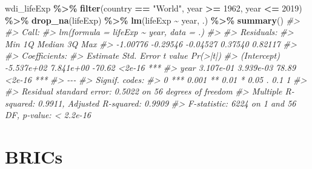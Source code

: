 \documentclass[
  xelatex, ja=standard]{bxjsbook}
\newenvironment{Shaded}{\begin{snugshade}}{\end{snugshade}}
\newcommand{\CommentTok}[1]{\textcolor[rgb]{0.56,0.35,0.01}{\textit{#1}}}
\newcommand{\DecValTok}[1]{\textcolor[rgb]{0.00,0.00,0.81}{#1}}
\newcommand{\FunctionTok}[1]{\textcolor[rgb]{0.13,0.29,0.53}{\textbf{#1}}}
\newcommand{\NormalTok}[1]{#1}
\newcommand{\SpecialCharTok}[1]{\textcolor[rgb]{0.81,0.36,0.00}{\textbf{#1}}}
\newcommand{\StringTok}[1]{\textcolor[rgb]{0.31,0.60,0.02}{#1}}
\theoremstyle{definition}
\theoremstyle{definition}
\theoremstyle{definition}
\theoremstyle{definition}
\theoremstyle{remark}
\begin{document}
\begin{Shaded}
\begin{Highlighting}[]
\NormalTok{wdi\_lifeExp }\SpecialCharTok{\%\textgreater{}\%} \FunctionTok{filter}\NormalTok{(country }\SpecialCharTok{==} \StringTok{"World"}\NormalTok{, year }\SpecialCharTok{\textgreater{}=} \DecValTok{1962}\NormalTok{, year }\SpecialCharTok{\textless{}=} \DecValTok{2019}\NormalTok{) }\SpecialCharTok{\%\textgreater{}\%} \FunctionTok{drop\_na}\NormalTok{(lifeExp) }\SpecialCharTok{\%\textgreater{}\%} \FunctionTok{lm}\NormalTok{(lifeExp }\SpecialCharTok{\textasciitilde{}}\NormalTok{ year, .) }\SpecialCharTok{\%\textgreater{}\%} \FunctionTok{summary}\NormalTok{()}
\CommentTok{\#\textgreater{} }
\CommentTok{\#\textgreater{} Call:}
\CommentTok{\#\textgreater{} lm(formula = lifeExp \textasciitilde{} year, data = .)}
\CommentTok{\#\textgreater{} }
\CommentTok{\#\textgreater{} Residuals:}
\CommentTok{\#\textgreater{}      Min       1Q   Median       3Q      Max }
\CommentTok{\#\textgreater{} {-}1.00776 {-}0.29546 {-}0.04527  0.37540  0.82117 }
\CommentTok{\#\textgreater{} }
\CommentTok{\#\textgreater{} Coefficients:}
\CommentTok{\#\textgreater{}               Estimate Std. Error t value Pr(\textgreater{}|t|)    }
\CommentTok{\#\textgreater{} (Intercept) {-}5.537e+02  7.841e+00  {-}70.62   \textless{}2e{-}16 ***}
\CommentTok{\#\textgreater{} year         3.107e{-}01  3.939e{-}03   78.89   \textless{}2e{-}16 ***}
\CommentTok{\#\textgreater{} {-}{-}{-}}
\CommentTok{\#\textgreater{} Signif. codes:  }
\CommentTok{\#\textgreater{} 0 \textquotesingle{}***\textquotesingle{} 0.001 \textquotesingle{}**\textquotesingle{} 0.01 \textquotesingle{}*\textquotesingle{} 0.05 \textquotesingle{}.\textquotesingle{} 0.1 \textquotesingle{} \textquotesingle{} 1}
\CommentTok{\#\textgreater{} }
\CommentTok{\#\textgreater{} Residual standard error: 0.5022 on 56 degrees of freedom}
\CommentTok{\#\textgreater{} Multiple R{-}squared:  0.9911, Adjusted R{-}squared:  0.9909 }
\CommentTok{\#\textgreater{} F{-}statistic:  6224 on 1 and 56 DF,  p{-}value: \textless{} 2.2e{-}16}
\end{Highlighting}
\end{Shaded}

\hypertarget{brics}{%
\section{BRICs}\label{brics}}
\end{document}
